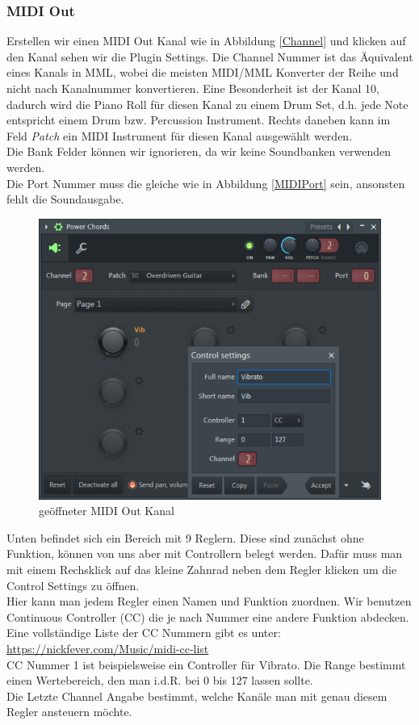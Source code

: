 \bigskip

\subsubsection*{MIDI Out}

Erstellen wir einen MIDI Out Kanal wie in Abbildung \ref{Channel} und klicken auf den Kanal sehen wir die Plugin Settings. Die Channel Nummer ist das Äquivalent eines Kanals in MML, wobei die meisten MIDI/MML Konverter der Reihe und nicht nach Kanalnummer konvertieren. Eine Besonderheit ist der Kanal 10, dadurch wird die Piano Roll für diesen Kanal zu einem Drum Set, d.h. jede Note entspricht einem Drum bzw. Percussion Instrument. Rechts daneben kann im Feld \textit{Patch} ein MIDI Instrument für diesen Kanal ausgewählt werden. \\
Die Bank Felder können wir ignorieren, da wir keine Soundbanken verwenden werden. \\
Die Port Nummer muss die gleiche wie in Abbildung \ref{MIDIPort} sein, ansonsten fehlt die Soundausgabe.

\begin{figure}[htbp] \centering
	\includegraphics[width=.75\linewidth]{images/MIDIOut.png}
	\caption{geöffneter MIDI Out Kanal}
	\label{MIDIOut}
\end{figure}

Unten befindet sich ein Bereich mit 9 Reglern. Diese sind zunächst ohne Funktion, können von uns aber mit Controllern belegt werden. Dafür muss man mit einem Rechsklick auf das kleine Zahnrad neben dem Regler klicken um die Control Settings zu öffnen. \\
Hier kann man jedem Regler einen Namen und Funktion zuordnen. Wir benutzen Continuous Controller (CC) die je nach Nummer eine andere Funktion abdecken. Eine vollständige Liste der CC Nummern gibt es unter: \\ \href{https://nickfever.com/Music/midi-cc-list}{https://nickfever.com/Music/midi-cc-list} \\
CC Nummer 1 ist beispielsweise ein Controller für Vibrato. Die Range bestimmt einen Wertebereich, den man i.d.R. bei 0 bis 127 lassen sollte. \\
Die Letzte Channel Angabe bestimmt, welche Kanäle man mit genau diesem Regler ansteuern möchte.

